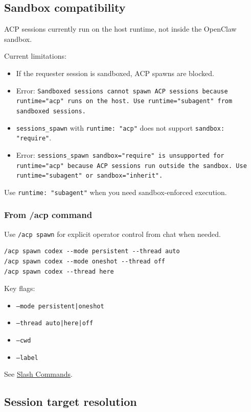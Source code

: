 \subsection{Sandbox compatibility}


ACP sessions currently run on the host runtime, not inside the OpenClaw sandbox.

Current limitations:

\begin{itemize}
  \item If the requester session is sandboxed, ACP spawns are blocked.
  \item Error: \texttt{Sandboxed sessions cannot spawn ACP sessions because runtime="acp" runs on the host. Use runtime="subagent" from sandboxed sessions.}
  \item \texttt{sessions\_spawn} with \texttt{runtime: "acp"} does not support \texttt{sandbox: "require"}.
  \item Error: \texttt{sessions\_spawn sandbox="require" is unsupported for runtime="acp" because ACP sessions run outside the sandbox. Use runtime="subagent" or sandbox="inherit".}
\end{itemize}


Use \texttt{runtime: "subagent"} when you need sandbox-enforced execution.

\subsubsection{From /acp command}


Use \texttt{/acp spawn} for explicit operator control from chat when needed.

\begin{lstlisting}
/acp spawn codex --mode persistent --thread auto
/acp spawn codex --mode oneshot --thread off
/acp spawn codex --thread here
\end{lstlisting}


Key flags:

\begin{itemize}
  \item \texttt{--mode persistent|oneshot}
  \item \texttt{--thread auto|here|off}
  \item \texttt{--cwd }
  \item \texttt{--label }
\end{itemize}


See \href{/tools/slash-commands}{Slash Commands}.

\subsection{Session target resolution}


